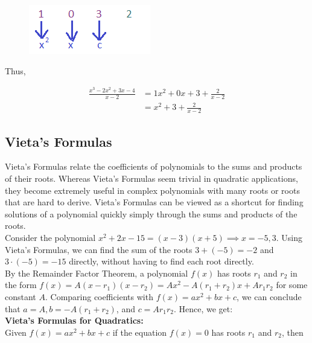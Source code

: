         \begin{figure} [hbt!]
            \centering
            \includegraphics [scale = 0.5] {Resources/Unit3Polynomials/synthdiv6.png}
        \end{figure}

        \noindent Thus,

        \begin{align*}
            \frac{x^3-2x^2+3x-4}{x-2} &= 1x^2+0x+3+\frac{2}{x-2} \\
            &= x^2+3+\frac{2}{x-2}
        \end{align*}



    \subsection{Vieta's Formulas}
        Vieta’s Formulas relate the coefficients of polynomials to the sums and products of their
        roots. Whereas Vieta’s Formulas seem trivial in quadratic applications, they become
        extremely useful in complex polynomials with many roots or roots that are hard to derive.
        Vieta’s Formulas can be viewed as a shortcut for finding solutions of a polynomial quickly
        simply through the sums and products of the roots. \\

        \noindent Consider the polynomial $x^2+2x-15=(x-3)(x+5) \implies x=-5,3$. Using Vieta's
        Formulas, we can find the sum of the roots $3+(-5)=-2$ and $3\cdot(-5)=-15$ directly,
        without having to find each root directly. \\

        \noindent By the Remainder Factor Theorem, a polynomial $f(x)$ has roots $r_1$ and $r_2$
        in the form $f(x)=A(x-r_1)(x-r_2)=Ax^2-A(r_1+r_2)x+Ar_1 r_2$ for some constant $A$.
        Comparing coefficients with $f(x) = ax^2+bx+c$, we can conclude that $a=A, b=-A(r_1+r_2)$,
        and $c=Ar_1 r_2$. Hence, we get: \\

        \noindent \color{purple} \textbf{Vieta's Formulas for Quadratics:} \color{black} \\
        \noindent Given $f(x) = ax^2+bx+c$ if the equation $f(x)=0$ has roots $r_1$ and $r_2$, then


